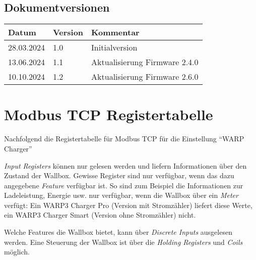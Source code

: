 \documentclass[a4paper,10pt]{article}
\begin{document}
\begin{multicols*}{2}
    \section{Dokumentversionen}
    \begin{tabular}{lll}
        \toprule
        Datum      & Version\hspace{-0.2pt} & Kommentar        \\
        \midrule
        28.03.2024 & 1.0     & Initialversion                  \\
        13.06.2024 & 1.1     & Aktualisierung Firmware 2.4.0   \\
        10.10.2024 & 1.2     & Aktualisierung Firmware 2.6.0   \\
        \bottomrule
    \end{tabular}


\end{multicols*}

\appendix

\begin{minipage}{0.49\linewidth}
 \section{Modbus TCP Registertabelle}
\label{modbus_tcp_registertabelle}
Nachfolgend die Registertabelle für Modbus TCP für die Einstellung \enquote{WARP
Charger}

\textit{Input Registers} können nur gelesen werden und liefern Informationen über den
Zustand der Wallbox. Gewisse Register sind nur verfügbar, wenn das dazu
angegebene \textit{Feature} verfügbar ist. So sind zum Beispiel die
Informationen zur Ladeleistung, Energie usw. nur verfügbar, wenn die Wallbox
über ein \textit{Meter} verfügt: Ein WARP3 Charger Pro (Version mit
Stromzähler) liefert diese Werte, ein WARP3 Charger Smart (Version ohne
Stromzähler) nicht.

Welche Features die Wallbox bietet, kann über \textit{Discrete Inputs} ausgelesen
werden. Eine Steuerung der Wallbox ist über die \textit{Holding Registers} und \textit{Coils}
möglich.
\end{minipage}
\end{document}
